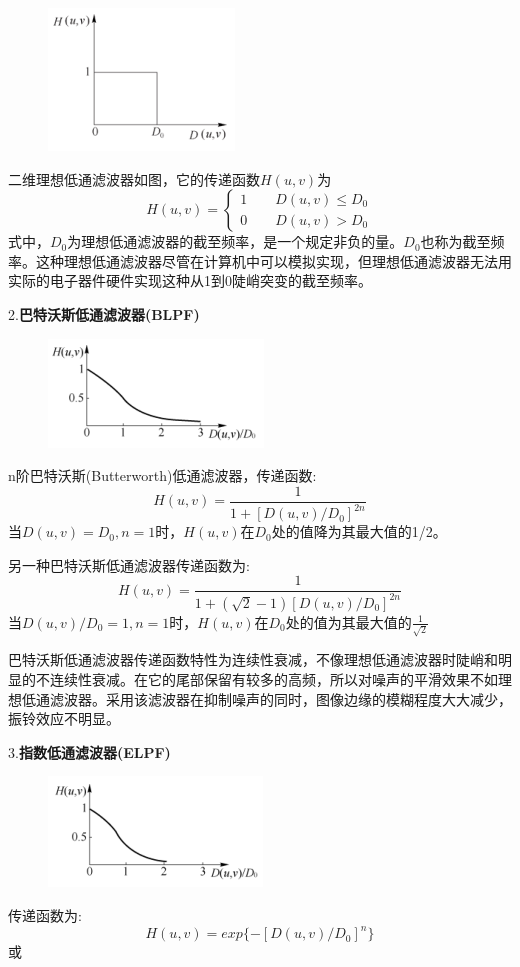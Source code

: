 \documentclass[11pt]{article}
\begin{document}
\begin{figure}
	\centering
	\includegraphics[width=0.23\textheight]{31}
\end{figure}
二维理想低通滤波器如图，它的传递函数$H(u,v)$为
$$H(u,v) = \left\{\begin{matrix}
	1 \qquad D(u,v)\leq D_0\\ 
	0 \qquad D(u,v)>D_0
\end{matrix}\right.$$
式中，$D_0$为理想低通滤波器的截至频率，是一个规定非负的量。$D_0$也称为截至频率。这种理想低通滤波器尽管在计算机中可以模拟实现，但理想低通滤波器无法用实际的电子器件硬件实现这种从1到0陡峭突变的截至频率。

2.\textbf{巴特沃斯低通滤波器(BLPF)}

\begin{figure}
	\centering
	\includegraphics[width=0.23\textheight]{32}
\end{figure}
n阶巴特沃斯(Butterworth)低通滤波器，传递函数:
$$H(u,v) = \frac{1}{1+[D(u,v)/D_0]^{2n}}$$
当$D(u,v)=D_0, n=1$时，$H(u,v)$在$D_0$处的值降为其最大值的1/2。

另一种巴特沃斯低通滤波器传递函数为:
$$H(u,v) = \frac{1}{1+(\sqrt{2}-1)[D(u,v)/D_0]^{2n}}$$
当$D(u,v)/D_0=1,n=1$时，$H(u,v)$在$D_0$处的值为其最大值的$\frac{1}{\sqrt{2}}$

巴特沃斯低通滤波器传递函数特性为连续性衰减，不像理想低通滤波器时陡峭和明显的不连续性衰减。在它的尾部保留有较多的高频，所以对噪声的平滑效果不如理想低通滤波器。采用该滤波器在抑制噪声的同时，图像边缘的模糊程度大大减少，振铃效应不明显。

3.\textbf{指数低通滤波器(ELPF)}

\begin{figure}
	\centering
	\includegraphics[width=0.23\textheight]{33}
\end{figure}
传递函数为:
$$H(u,v) = exp\{-[D(u,v)/D_0]^n\}$$
或
\end{document}
